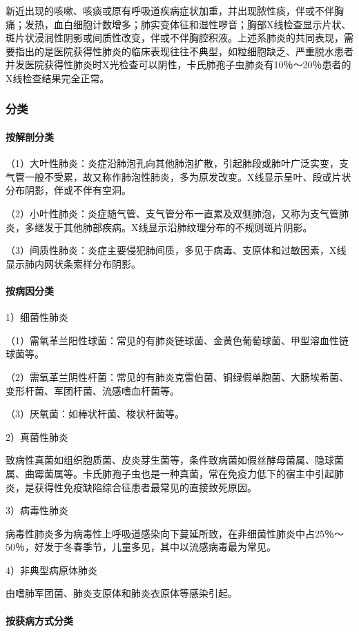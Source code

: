 新近出现的咳嗽、咳痰或原有呼吸道疾病症状加重，并出现脓性痰，伴或不伴胸痛；发热，血白细胞计数增多；肺实变体征和湿性啰音；胸部X线检查显示片状、斑片状浸润性阴影或间质性改变，伴或不伴胸腔积液。上述系肺炎的共同表现，需要指出的是医院获得性肺炎的临床表现往往不典型，如粒细胞缺乏、严重脱水患者并发医院获得性肺炎时X光检查可以阴性，卡氏肺孢子虫肺炎有10％～20％患者的X线检查结果完全正常。

\subsubsection{分类}
\paragraph{按解剖分类}

（1）大叶性肺炎：炎症沿肺泡孔向其他肺泡扩散，引起肺段或肺叶广泛实变，支气管一般不受累，故又称作肺泡性肺炎，多为原发改变。X线显示呈叶、段或片状分布阴影，伴或不伴有空洞。

（2）小叶性肺炎：炎症随气管、支气管分布一直累及双侧肺泡，又称为支气管肺炎，多继发于其他肺部疾病。X线显示沿肺纹理分布的不规则斑片阴影。

（3）间质性肺炎：炎症主要侵犯肺间质，多见于病毒、支原体和过敏因素，X线显示肺内网状条索样分布阴影。
\paragraph{按病因分类}

1）细菌性肺炎

（1）需氧革兰阳性球菌：常见的有肺炎链球菌、金黄色葡萄球菌、甲型溶血性链球菌等。

（2）需氧革兰阴性杆菌：常见的有肺炎克雷伯菌、铜绿假单胞菌、大肠埃希菌、变形杆菌、军团杆菌、流感嗜血杆菌等。

（3）厌氧菌：如棒状杆菌、梭状杆菌等。

2）真菌性肺炎

致病性真菌如组织胞质菌、皮炎芽生菌等，条件致病菌如假丝酵母菌属、隐球菌属、曲霉菌属等。卡氏肺孢子虫也是一种真菌，常在免疫力低下的宿主中引起肺炎，是获得性免疫缺陷综合征患者最常见的直接致死原因。

3）病毒性肺炎

病毒性肺炎多为病毒性上呼吸道感染向下蔓延所致，在非细菌性肺炎中占25％～50％，好发于冬春季节，儿童多见，其中以流感病毒最为常见。

4）非典型病原体肺炎

由嗜肺军团菌、肺炎支原体和肺炎衣原体等感染引起。
\paragraph{按获病方式分类}

